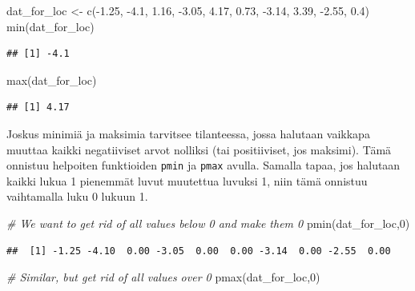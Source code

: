 \documentclass[
]{book}
\newenvironment{Shaded}{\begin{snugshade}}{\end{snugshade}}
\newcommand{\CommentTok}[1]{\textcolor[rgb]{0.56,0.35,0.01}{\textit{#1}}}
\newcommand{\DecValTok}[1]{\textcolor[rgb]{0.00,0.00,0.81}{#1}}
\newcommand{\FloatTok}[1]{\textcolor[rgb]{0.00,0.00,0.81}{#1}}
\newcommand{\FunctionTok}[1]{\textcolor[rgb]{0.00,0.00,0.00}{#1}}
\newcommand{\NormalTok}[1]{#1}
\newcommand{\OtherTok}[1]{\textcolor[rgb]{0.56,0.35,0.01}{#1}}
\newcommand{\SpecialCharTok}[1]{\textcolor[rgb]{0.00,0.00,0.00}{#1}}
\begin{document}
\begin{Shaded}
\begin{Highlighting}[]
\NormalTok{dat\_for\_loc }\OtherTok{\textless{}{-}} \FunctionTok{c}\NormalTok{(}\SpecialCharTok{{-}}\FloatTok{1.25}\NormalTok{, }\SpecialCharTok{{-}}\FloatTok{4.1}\NormalTok{, }\FloatTok{1.16}\NormalTok{, }\SpecialCharTok{{-}}\FloatTok{3.05}\NormalTok{, }\FloatTok{4.17}\NormalTok{, }\FloatTok{0.73}\NormalTok{, }\SpecialCharTok{{-}}\FloatTok{3.14}\NormalTok{, }\FloatTok{3.39}\NormalTok{, }\SpecialCharTok{{-}}\FloatTok{2.55}\NormalTok{, }\FloatTok{0.4}\NormalTok{)}
\FunctionTok{min}\NormalTok{(dat\_for\_loc)}
\end{Highlighting}
\end{Shaded}

\begin{verbatim}
## [1] -4.1
\end{verbatim}

\begin{Shaded}
\begin{Highlighting}[]
\FunctionTok{max}\NormalTok{(dat\_for\_loc)}
\end{Highlighting}
\end{Shaded}

\begin{verbatim}
## [1] 4.17
\end{verbatim}

Joskus minimiä ja maksimia tarvitsee tilanteessa, jossa halutaan vaikkapa muuttaa kaikki negatiiviset arvot nolliksi (tai positiiviset, jos maksimi). Tämä onnistuu helpoiten funktioiden \texttt{pmin} ja \texttt{pmax} avulla. Samalla tapaa, jos halutaan kaikki lukua 1 pienemmät luvut muutettua luvuksi 1, niin tämä onnistuu vaihtamalla luku 0 lukuun 1.

\begin{Shaded}
\begin{Highlighting}[]
\CommentTok{\# We want to get rid of all values below 0 and make them 0}
\FunctionTok{pmin}\NormalTok{(dat\_for\_loc,}\DecValTok{0}\NormalTok{)}
\end{Highlighting}
\end{Shaded}

\begin{verbatim}
##  [1] -1.25 -4.10  0.00 -3.05  0.00  0.00 -3.14  0.00 -2.55  0.00
\end{verbatim}

\begin{Shaded}
\begin{Highlighting}[]
\CommentTok{\# Similar, but get rid of all values over 0}
\FunctionTok{pmax}\NormalTok{(dat\_for\_loc,}\DecValTok{0}\NormalTok{)}
\end{Highlighting}
\end{Shaded}
\end{document}
